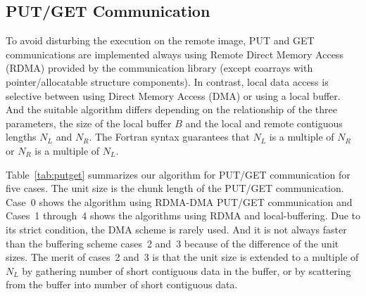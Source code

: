 \subsection{PUT/GET Communication}

To avoid disturbing the execution on the remote image, PUT and GET communications
are implemented always using Remote Direct Memory Access (RDMA) provided by 
the communication library (except coarrays with pointer/allocatable structure components). 
In contrast, local data access is selective between using Direct Memory Access (DMA) or
using a local buffer. And the suitable algorithm differs depending on the 
relationship of the three parameters, the size of the local buffer $B$ and the 
local and remote contiguous lengths $N_L$ and $N_R$.
The Fortran syntax guarantees that $N_L$ is a multiple of $N_R$ or $N_R$ is a multiple of $N_L$.

Table~\ref{tab:putget} summarizes our algorithm for PUT/GET communication for five cases.
The unit size is the chunk length of the PUT/GET communication.
Case~0 shows the algorithm using RDMA-DMA PUT/GET communication and Cases~1 through~4
shows the algorithms using RDMA and local-buffering. 
Due to its strict condition, the DMA scheme is rarely used.
And it is not always faster than the buffering scheme cases~2 and~3 because of the 
difference of the unit sizes. The merit of cases~2 and~3 is that the unit size 
is extended to a multiple of $N_L$ by gathering number of short contiguous data in the buffer,
or by scattering from the buffer into number of short contiguous data.

